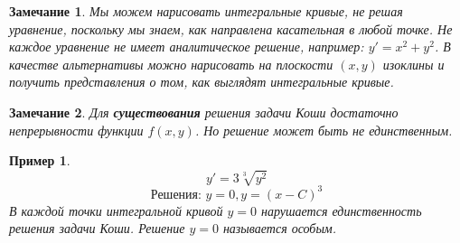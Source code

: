 \documentclass{article}
\newtheorem*{ntc}{Замечание}
\newtheorem{xmp}{Пример}
\begin{document}
  \begin{ntc}
  Мы можем нарисовать интегральные кривые, не решая уравнение, поскольку мы знаем, как направлена касательная в любой точке.
  Не каждое уравнение не имеет аналитическое решение, например: $ y' = x^2 + y^2 $. В качестве альтернативы можно нарисовать на плоскости $(x, y)$ изоклины и получить представления о том, как выглядят интегральные кривые.
  \end{ntc}
  
  \begin{ntc}
  Для \textbf{существования} решения задачи Коши достаточно непрерывности функции $f(x, y)$. Но решение может быть не единственным.
  \end{ntc}
  
  \begin{xmp}
  $$ y' = 3\sqrt[3]{y^2} $$
  $$ \text{Решения: } y = 0, y = (x - C)^3 $$ В каждой точки интегральной кривой $y = 0$ нарушается единственность решения задачи Коши. Решение $y = 0$ называется особым. 
  \end{xmp}
\end{document}
